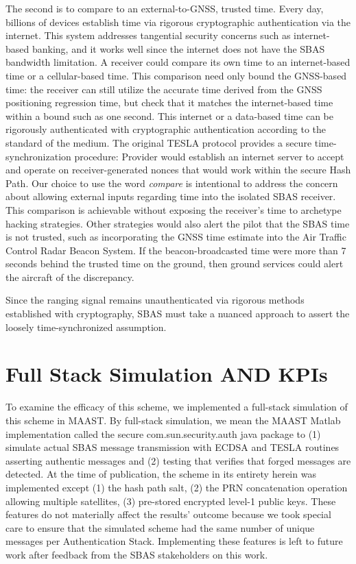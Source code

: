 \documentclass[letterpaper,times]{IONconf/IONconf}
\begin{document}
	The second is to compare to an external-to-GNSS, trusted time.
	Every day, billions of devices establish time via rigorous cryptographic authentication via the internet.
	This system addresses tangential security concerns such as internet-based banking, and it works well since the internet does not have the SBAS bandwidth limitation.
	A receiver could compare its own time to an internet-based time or a cellular-based time.
	This comparison need only bound the GNSS-based time: the receiver can still utilize the accurate time derived from the GNSS positioning regression time, but check that it matches the internet-based time within a bound such as one second.
	This internet or a data-based time can be rigorously authenticated with cryptographic authentication according to the standard of the medium.
	The original TESLA protocol provides a secure time-synchronization procedure: Provider would establish an internet server to accept and operate on receiver-generated nonces that would work within the secure Hash Path\cite{perrig2005timed}.
	Our choice to use the word {\em compare} is intentional to address the concern about allowing external inputs regarding time into the isolated SBAS receiver.
	This comparison is achievable without exposing the receiver's time to archetype hacking strategies.
	Other strategies would also alert the pilot that the SBAS time is not trusted, such as incorporating the GNSS time estimate into the Air Traffic Control Radar Beacon System.
	If the beacon-broadcasted time were more than 7 seconds behind the trusted time on the ground, then ground services could alert the aircraft of the discrepancy.

	Since the ranging signal remains unauthenticated via rigorous methods established with cryptography, SBAS must take a nuanced approach to assert the loosely time-synchronized assumption.

\section{Full Stack Simulation AND KPIs} \label{sec:full_stack_simulation}

	To examine the efficacy of this scheme, we implemented a full-stack simulation of this scheme in MAAST.
	By full-stack simulation, we mean the MAAST Matlab implementation called the secure com.sun.security.auth java package to (1) simulate actual SBAS message transmission with ECDSA and TESLA routines asserting authentic messages and (2) testing that verifies that forged messages are detected.
	At the time of publication, the scheme in its entirety herein was implemented except (1) the hash path salt, (2) the PRN concatenation operation allowing multiple satellites, (3) pre-stored encrypted level-1 public keys.
	These features do not materially affect the results' outcome because we took special care to ensure that the simulated scheme had the same number of unique messages per Authentication Stack.
	Implementing these features is left to future work after feedback from the SBAS stakeholders on this work.
\end{document}
